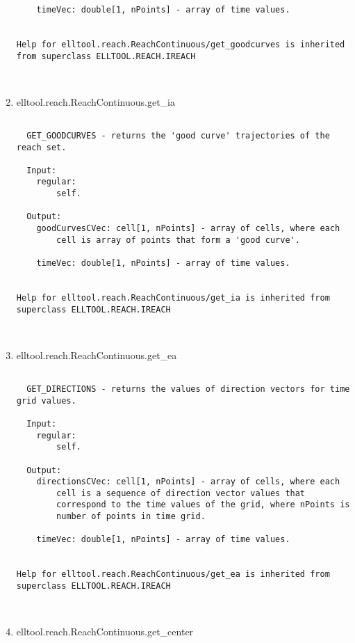 \begin{enumerate}
\begin{lstlisting}
    timeVec: double[1, nPoints] - array of time values.


Help for elltool.reach.ReachContinuous/get_goodcurves is inherited from superclass ELLTOOL.REACH.IREACH



\end{lstlisting}
\fontfamily{\familydefault}
\selectfont
\item {elltool.reach.ReachContinuous.get\_ia}
\selectfont
\begin{lstlisting}

  GET_GOODCURVES - returns the 'good curve' trajectories of the reach set.

  Input:
    regular:
        self.

  Output:
    goodCurvesCVec: cell[1, nPoints] - array of cells, where each
        cell is array of points that form a 'good curve'.

    timeVec: double[1, nPoints] - array of time values.


Help for elltool.reach.ReachContinuous/get_ia is inherited from superclass ELLTOOL.REACH.IREACH



\end{lstlisting}
\fontfamily{\familydefault}
\selectfont
\item {elltool.reach.ReachContinuous.get\_ea}
\selectfont
\begin{lstlisting}

  GET_DIRECTIONS - returns the values of direction vectors for time grid values.

  Input:
    regular:
        self.

  Output:
    directionsCVec: cell[1, nPoints] - array of cells, where each
        cell is a sequence of direction vector values that
        correspond to the time values of the grid, where nPoints is
        number of points in time grid.

    timeVec: double[1, nPoints] - array of time values.


Help for elltool.reach.ReachContinuous/get_ea is inherited from superclass ELLTOOL.REACH.IREACH



\end{lstlisting}
\fontfamily{\familydefault}
\selectfont
\item {elltool.reach.ReachContinuous.get\_center}
\selectfont
\begin{lstlisting}


\end{lstlisting}
\end{enumerate}
